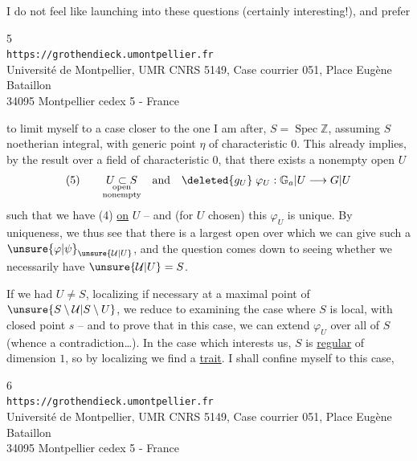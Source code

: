 I do not feel like launching into these questions (certainly interesting!),
and prefer

\begin{center}
\small
5\\
\texttt{https://grothendieck.umontpellier.fr}\\
Université de Montpellier, UMR CNRS 5149, Case courrier 051, Place Eugène Bataillon\\
34095 Montpellier cedex 5 - France
\end{center}


to limit myself to a case closer to the one I am after, $S=\operatorname{Spec}\mathbb Z$,
assuming $S$ noetherian integral,  with generic point $\eta$
of characteristic $0$. This already implies, by the result over a field of characteristic $0$,
that there exists a nonempty open $U$
\[
(5)\qquad
\underset{\substack{\text{open}\\\text{nonempty}}}{U\subset S}
\quad\text{and}\quad
\deleted{g_U}\;\varphi_U:\mathbb G_a\vert U\longrightarrow G\vert U
\]
such that we have (4) \uline{on} $U$ -- and (for $U$ chosen) this $\varphi_U$
is unique. By uniqueness, we thus see that there is a largest open
 over which we can give such a
$\unsure{\varphi|\psi}_{\unsure{\mathcal U|U}}$,
and the question comes down to seeing whether we necessarily have $\unsure{\mathcal U|U}=S$.

If we had $U\ne S$, localizing if necessary at a maximal point of $\unsure{S\setminus\mathcal U|S\setminus U}$,
we  reduce to examining the case where $S$ is local,
with closed point $s$ -- and to  prove
that in this case, we can extend $\varphi_U$ over all of $S$
(whence a contradiction\ldots). In the case which interests us, $S$ is
\uline{regular} of dimension $1$, so by localizing we find a \uline{trait}.
I shall confine myself to this case, 

\begin{center}
\small
6\\
\texttt{https://grothendieck.umontpellier.fr}\\
Université de Montpellier, UMR CNRS 5149, Case courrier 051, Place Eugène Bataillon\\
34095 Montpellier cedex 5 - France
\end{center}

